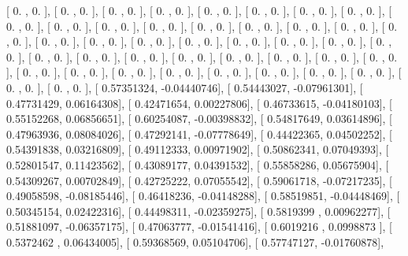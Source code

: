 \documentclass{article}
\begin{document}
       [ 0.        ,  0.        ],
       [ 0.        ,  0.        ],
       [ 0.        ,  0.        ],
       [ 0.        ,  0.        ],
       [ 0.        ,  0.        ],
       [ 0.        ,  0.        ],
       [ 0.        ,  0.        ],
       [ 0.        ,  0.        ],
       [ 0.        ,  0.        ],
       [ 0.        ,  0.        ],
       [ 0.        ,  0.        ],
       [ 0.        ,  0.        ],
       [ 0.        ,  0.        ],
       [ 0.        ,  0.        ],
       [ 0.        ,  0.        ],
       [ 0.        ,  0.        ],
       [ 0.        ,  0.        ],
       [ 0.        ,  0.        ],
       [ 0.        ,  0.        ],
       [ 0.        ,  0.        ],
       [ 0.        ,  0.        ],
       [ 0.        ,  0.        ],
       [ 0.        ,  0.        ],
       [ 0.        ,  0.        ],
       [ 0.        ,  0.        ],
       [ 0.        ,  0.        ],
       [ 0.        ,  0.        ],
       [ 0.        ,  0.        ],
       [ 0.        ,  0.        ],
       [ 0.        ,  0.        ],
       [ 0.        ,  0.        ],
       [ 0.        ,  0.        ],
       [ 0.        ,  0.        ],
       [ 0.        ,  0.        ],
       [ 0.        ,  0.        ],
       [ 0.        ,  0.        ],
       [ 0.        ,  0.        ],
       [ 0.        ,  0.        ],
       [ 0.        ,  0.        ],
       [ 0.        ,  0.        ],
       [ 0.        ,  0.        ],
       [ 0.        ,  0.        ],
       [ 0.        ,  0.        ],
       [ 0.57351324, -0.04440746],
       [ 0.54443027, -0.07961301],
       [ 0.47731429,  0.06164308],
       [ 0.42471654,  0.00227806],
       [ 0.46733615, -0.04180103],
       [ 0.55152268,  0.06856651],
       [ 0.60254087, -0.00398832],
       [ 0.54817649,  0.03614896],
       [ 0.47963936,  0.08084026],
       [ 0.47292141, -0.07778649],
       [ 0.44422365,  0.04502252],
       [ 0.54391838,  0.03216809],
       [ 0.49112333,  0.00971902],
       [ 0.50862341,  0.07049393],
       [ 0.52801547,  0.11423562],
       [ 0.43089177,  0.04391532],
       [ 0.55858286,  0.05675904],
       [ 0.54309267,  0.00702849],
       [ 0.42725222,  0.07055542],
       [ 0.59061718, -0.07217235],
       [ 0.49058598, -0.08185446],
       [ 0.46418236, -0.04148288],
       [ 0.58519851, -0.04448469],
       [ 0.50345154,  0.02422316],
       [ 0.44498311, -0.02359275],
       [ 0.5819399 ,  0.00962277],
       [ 0.51881097, -0.06357175],
       [ 0.47063777, -0.01541416],
       [ 0.6019216 ,  0.0998873 ],
       [ 0.5372462 ,  0.06434005],
       [ 0.59368569,  0.05104706],
       [ 0.57747127, -0.01760878],
\end{document}
